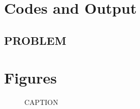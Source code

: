 \documentclass{article}
\begin{document}
\pagebreak
\appendix
\section{Codes and Output}

\subsection{PROBLEM}

\pagebreak
\section{Figures}

\begin{figure}[htb!]
\begin{center}
\caption{CAPTION}
\end{center}
\end{figure}
\end{document}
